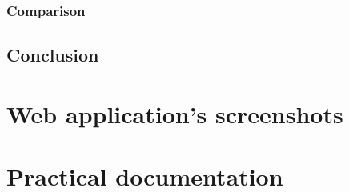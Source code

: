 \documentclass[a4paper,11pt]{report}
\begin{document}
  \subsection{Comparison}
  
  
  
  \section{Conclusion}

  
  
  
  
\newpage
\appendix
\chapter{Web application's screenshots} \label{app:screenshots}

\chapter{Practical documentation} \label{app:practical_documentation}
  
  


\end{document}
